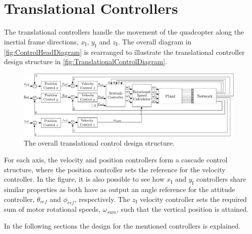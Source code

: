 \section{Translational Controllers} \label{sec:TranslationalController}

The translational controllers handle the movement of the quadcopter along the inertial frame directions, $x_{\mathrm{I}}$, $y_{\mathrm{I}}$ and $z_{\mathrm{I}}$. The overall diagram in \autoref{fig:ControlHeadDiagram} is rearranged to illustrate the translational controller design structure in \autoref{fig:TranslationalControlDiagram}.
%
\begin{figure}[H]
	\centering
	\includegraphics[scale=0.2]{figures/ControlDiagramPoster}
	\caption{The overall translational control design structure.}
	\label{fig:TranslationalControlDiagram}
\end{figure}
%
For each axis, the velocity and position controllers form a cascade control structure, where the position controller sets the reference for the velocity controller. In the figure, it is also possible to see how $x_{\mathrm{I}}$ and $y_{\mathrm{I}}$ controllers share similar properties as both have as output an angle reference for the attitude controller, $\theta_{ref}$ and $\phi_{ref}$, respectively. 
The $z_{\mathrm{I}}$ velocity controller sets the required sum of motor rotational speeds, $\omega_{sum}$, such that the vertical position is attained.

In the following sections the design for the mentioned controllers is explained.